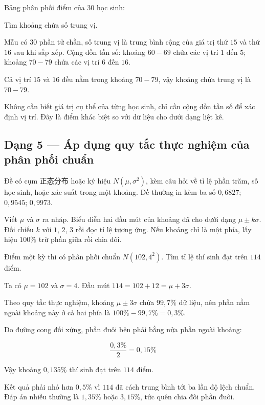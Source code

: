 \documentclass[11pt, a4paper]{article}
\begin{document}
\begin{vidu}[{4}]
Bảng phân phối điểm của 30 học sinh:


Tìm khoảng chứa số trung vị.

Mẫu có $30$ phần tử chẵn, số trung vị là trung bình cộng của giá trị thứ $15$ và thứ $16$ sau khi sắp xếp. Cộng dồn tần số: khoảng $60-69$ chứa các vị trí $1$ đến $5$; khoảng $70-79$ chứa các vị trí $6$ đến $16$.

Cả vị trí $15$ và $16$ đều nằm trong khoảng $70-79$, vậy khoảng chứa trung vị là $70-79$.

 Không cần biết giá trị cụ thể của từng học sinh, chỉ cần cộng dồn tần số để xác định vị trí. Đây là điểm khác biệt so với dữ liệu cho dưới dạng liệt kê.

\end{vidu}
\subsection{Dạng 5 — Áp dụng quy tắc thực nghiệm của phân phối chuẩn}

 Đề có cụm 正态分布 hoặc ký hiệu $N(\mu, \sigma^2)$, kèm câu hỏi về tỉ lệ phần trăm, số học sinh, hoặc xác suất trong một khoảng. Đề thường in kèm ba số $0,6827$; $0,9545$; $0,9973$.

 Viết $\mu$ và $\sigma$ ra nháp. Biểu diễn hai đầu mút của khoảng đã cho dưới dạng $\mu \pm k\sigma$. Đối chiếu $k$ với $1$, $2$, $3$ rồi đọc tỉ lệ tương ứng. Nếu khoảng chỉ là một phía, lấy hiệu $100\%$ trừ phần giữa rồi chia đôi.

\begin{vidu}[{5}]
Điểm một kỳ thi có phân phối chuẩn $N(102, 4^2)$. Tìm tỉ lệ thí sinh đạt trên $114$ điểm.

Ta có $\mu = 102$ và $\sigma = 4$. Đầu mút $114 = 102 + 12 = \mu + 3\sigma$.

Theo quy tắc thực nghiệm, khoảng $\mu \pm 3\sigma$ chứa $99,7\%$ dữ liệu, nên phần nằm ngoài khoảng này ở cả hai phía là $100\% - 99,7\% = 0,3\%$.

Do đường cong đối xứng, phần đuôi bên phải bằng nửa phần ngoài khoảng:

$$\frac{0,3\%}{2} = 0,15\%$$

Vậy khoảng $0,135\%$ thí sinh đạt trên $114$ điểm.

 Kết quả phải nhỏ hơn $0,5\%$ vì $114$ đã cách trung bình tới ba lần độ lệch chuẩn. Đáp án nhiễu thường là $1,35\%$ hoặc $3,15\%$, tức quên chia đôi phần đuôi.

\end{vidu}
\end{document}
